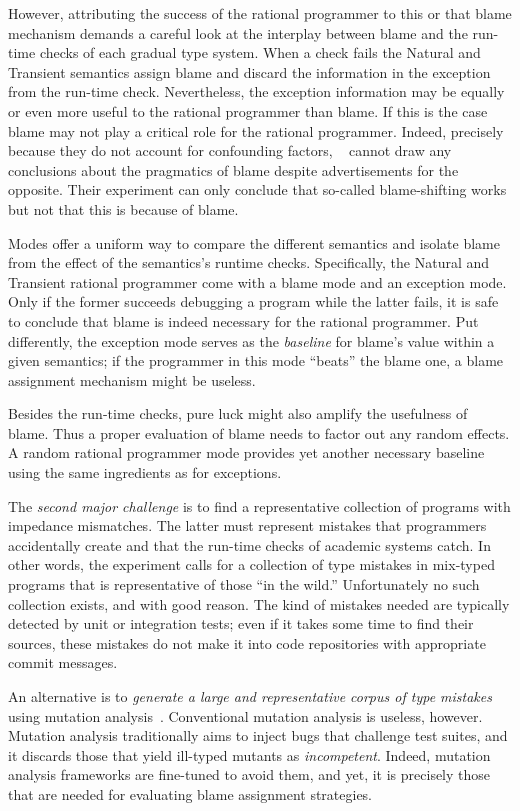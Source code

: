 However, attributing the success of the rational programmer to this or
that blame mechanism demands a careful look at the interplay between blame
and the run-time checks of each gradual type system. When a check fails
the Natural and Transient semantics assign blame and discard  the
information in the exception from the run-time check. Nevertheless, the
exception information may be equally or even more useful to the rational
programmer than blame. If this is the case blame may not play a critical
role for the rational programmer. Indeed, precisely because they do not
account for confounding factors, ~\citet{lksfd-popl-2020} cannot draw any
conclusions about the pragmatics of blame despite advertisements for the
opposite. Their experiment can only conclude that so-called blame-shifting
works but not that this is because of blame. 

Modes offer a uniform way to compare the different semantics and  isolate
blame from the effect of the semantics's runtime checks. Specifically, the Natural and
Transient rational programmer come with a blame mode and an exception
mode. Only if the former succeeds debugging a program while the latter
fails, it is safe to conclude that blame is indeed necessary for the
rational programmer. Put differently, the exception mode serves as the
{\em baseline\/} for blame's value within a given semantics; if the
programmer in this mode ``beats'' the  blame one, a blame assignment
mechanism might be useless.

Besides the run-time checks, pure luck might also amplify the usefulness
of blame. Thus a proper evaluation of blame needs to factor out any random
effects. A random rational programmer mode provides yet another necessary
baseline using the same ingredients as for exceptions. 

The {\em second major challenge\/} is to find a representative collection of
programs with impedance mismatches. The latter must represent mistakes that programmers
accidentally create and that the run-time checks of academic systems catch. In
other words, the experiment calls for a collection of type mistakes in
mix-typed programs that is representative of those ``in the wild.''
Unfortunately no such collection exists, and with good reason. The kind of
mistakes needed are typically detected by unit or integration tests; even if it
takes some time to find their sources, these mistakes do not make it into code
repositories with appropriate commit messages.

An alternative is to {\em generate a large and representative corpus of type
mistakes \/} using mutation analysis~\cite{lipton1971fault, demillo1978hints,
jia2011analysis}. Conventional mutation analysis is useless, however.  Mutation
analysis traditionally aims to inject bugs that challenge test suites, and it
discards those that yield ill-typed mutants as \emph{incompetent}. Indeed,
mutation analysis frameworks are fine-tuned to avoid them, and yet, it is
precisely those that are needed for evaluating blame assignment strategies.

